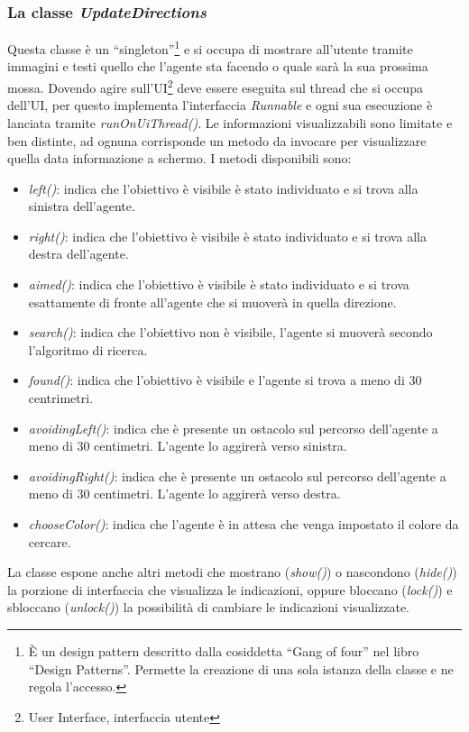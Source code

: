 \subsubsection{La classe \emph{UpdateDirections}}
Questa classe è un ``singleton''\footnote{È un design pattern descritto dalla 
cosiddetta ``Gang of four'' nel libro ``Design Patterns''. 
Permette la creazione di una sola istanza della classe e ne regola l'accesso. } 
e si occupa di mostrare all'utente tramite  immagini e testi quello che l'agente
sta facendo o quale sarà la sua prossima  mossa. Dovendo agire 
sull'UI\footnote{User Interface, interfaccia utente} deve essere eseguita sul thread
che si occupa dell'UI, per questo implementa l'interfaccia \emph{Runnable} e 
ogni sua esecuzione è lanciata  tramite \emph{runOnUiThread()}. 
Le informazioni visualizzabili sono limitate e ben distinte,
ad ognuna corrisponde un metodo da invocare per visualizzare quella data informazione
a schermo. I metodi disponibili sono: 
\begin{itemize}
	\item \emph{left()}: indica che l'obiettivo è visibile è stato individuato e si trova alla sinistra dell'agente.
	\item \emph{right()}: indica che l'obiettivo è visibile è stato individuato e si trova alla destra dell'agente.
	\item \emph{aimed()}: indica che l'obiettivo è visibile è stato individuato e si trova esattamente di fronte all'agente che si muoverà in quella direzione.
	\item \emph{search()}: indica che l'obiettivo non è visibile, l'agente si muoverà secondo l'algoritmo di ricerca.
	\item \emph{found()}: indica che l'obiettivo è visibile e l'agente si trova a meno di 30 centrimetri.
	\item \emph{avoidingLeft()}: indica che è presente un ostacolo sul percorso dell'agente a meno di 30 centimetri. L'agente lo aggirerà verso sinistra. 
	\item \emph{avoidingRight()}: indica che è presente un ostacolo sul percorso dell'agente a meno di 30 centimetri. L'agente lo aggirerà verso destra.
	\item \emph{chooseColor()}: indica che l'agente è in attesa che venga impostato il colore da cercare. 
\end{itemize}
La classe espone anche altri metodi che mostrano (\emph{show()}) o nascondono 
(\emph{hide()}) la porzione di interfaccia che visualizza le indicazioni, oppure bloccano (\emph{lock()})
e sbloccano (\emph{unlock()}) la possibilità di cambiare le indicazioni visualizzate.

